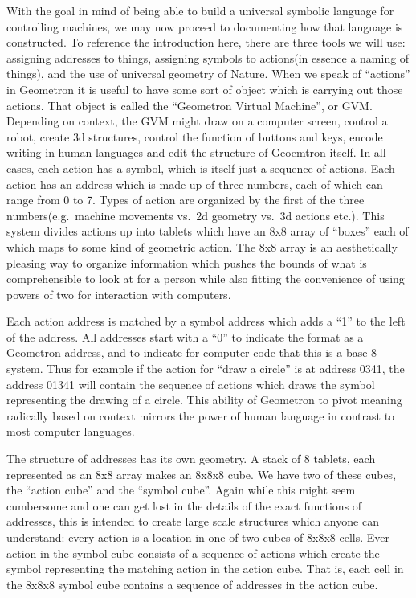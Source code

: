 With the goal in mind of being able to build a universal symbolic
language for controlling machines, we may now proceed to documenting how
that language is constructed. To reference the introduction here, there
are three tools we will use: assigning addresses to things, assigning
symbols to actions(in essence a naming of things), and the use of
universal geometry of Nature. When we speak of ``actions'' in Geometron
it is useful to have some sort of object which is carrying out those
actions. That object is called the ``Geometron Virtual Machine'', or
GVM. Depending on context, the GVM might draw on a computer screen,
control a robot, create 3d structures, control the function of buttons
and keys, encode writing in human languages and edit the structure of
Geoemtron itself. In all cases, each action has a symbol, which is
itself just a sequence of actions. Each action has an address which is
made up of three numbers, each of which can range from 0 to 7. Types of
action are organized by the first of the three numbers(e.g.~machine
movements vs.~2d geometry vs.~3d actions etc.). This system divides
actions up into tablets which have an 8x8 array of ``boxes'' each of
which maps to some kind of geometric action. The 8x8 array is an
aesthetically pleasing way to organize information which pushes the
bounds of what is comprehensible to look at for a person while also
fitting the convenience of using powers of two for interaction with
computers.

Each action address is matched by a symbol address which adds a ``1'' to
the left of the address. All addresses start with a ``0'' to indicate
the format as a Geometron address, and to indicate for computer code
that this is a base 8 system. Thus for example if the action for ``draw
a circle'' is at address 0341, the address 01341 will contain the
sequence of actions which draws the symbol representing the drawing of a
circle. This ability of Geometron to pivot meaning radically based on
context mirrors the power of human language in contrast to most computer
languages.

The structure of addresses has its own geometry. A stack of 8 tablets,
each represented as an 8x8 array makes an 8x8x8 cube. We have two of
these cubes, the ``action cube'' and the ``symbol cube''. Again while
this might seem cumbersome and one can get lost in the details of the
exact functions of addresses, this is intended to create large scale
structures which anyone can understand: every action is a location in
one of two cubes of 8x8x8 cells. Ever action in the symbol cube consists
of a sequence of actions which create the symbol representing the
matching action in the action cube. That is, each cell in the 8x8x8
symbol cube contains a sequence of addresses in the action cube.


